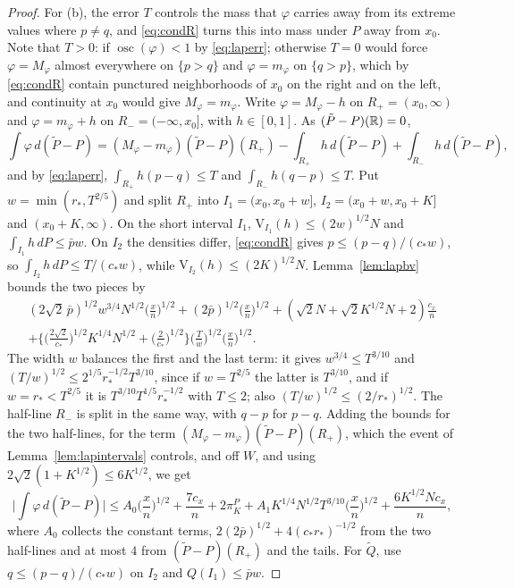 \begin{proof}
For (b), the error $T$ controls the mass that $\varphi$ carries away from its extreme values where $p\neq q$, and
\eqref{eq:condR} turns this into mass under $P$ away from $x_0$. Note that $T>0$: if
$\operatorname{osc}(\varphi)<1$ by \eqref{eq:laperr}; otherwise $T=0$ would force $\varphi=M_\varphi$ almost everywhere on
$\{p>q\}$ and $\varphi=m_\varphi$ on $\{q>p\}$, which by \eqref{eq:condR} contain punctured neighborhoods of $x_0$ on the
right and on the left, and continuity at $x_0$ would give $M_\varphi=m_\varphi$. Write $\varphi=M_\varphi-h$ on $R_+=(x_0,\infty)$ and
$\varphi=m_\varphi+h$ on $R_-=(-\infty,x_0]$, with $h\in[0,1]$. As $(\tilde P-P)(\mathbb{R})=0$,
\[
\int\varphi\,d(\tilde P-P)=(M_\varphi-m_\varphi)(\tilde P-P)(R_+)-\int_{R_+}h\,d(\tilde P-P)+\int_{R_-}h\,d(\tilde P-P),
\]
and by \eqref{eq:laperr}, $\int_{R_+}h(p-q)\le T$ and $\int_{R_-}h(q-p)\le T$. Put $w=\min(r_\ast,T^{2/5})$ and split $R_+$
into $I_1=(x_0,x_0+w]$, $I_2=(x_0+w,x_0+K]$ and $(x_0+K,\infty)$. On the short interval $I_1$,
$\mathrm V_{I_1}(h)\le(2w)^{1/2}N$ and $\int_{I_1}h\,dP\le\bar pw$. On $I_2$ the densities differ, \eqref{eq:condR} gives
$p\le(p-q)/(c_\ast w)$, so $\int_{I_2}h\,dP\le T/(c_\ast w)$, while $\mathrm V_{I_2}(h)\le(2K)^{1/2}N$.
Lemma~\ref{lem:lapbv} bounds the two pieces by
\begin{multline*}
(2\sqrt2\,\bar p)^{1/2}w^{3/4}N^{1/2}\Big(\frac xn\Big)^{1/2}+(2\bar p)^{1/2}\Big(\frac xn\Big)^{1/2}
+(\sqrt2N+\sqrt2K^{1/2}N+2)\frac{c_x}n\\
+\Big\{\Big(\frac{2\sqrt2}{c_\ast}\Big)^{1/2}K^{1/4}N^{1/2}+\Big(\frac2{c_\ast}\Big)^{1/2}\Big\}\Big(\frac Tw\Big)^{1/2}\Big(\frac xn\Big)^{1/2} .
\end{multline*}
The width $w$ balances the first and the last term: it gives $w^{3/4}\le T^{3/10}$ and
$(T/w)^{1/2}\le2^{1/5}r_\ast^{-1/2}T^{3/10}$, since if $w=T^{2/5}$ the latter is $T^{3/10}$, and if $w=r_\ast<T^{2/5}$ it is
$T^{3/10}T^{1/5}r_\ast^{-1/2}$ with $T\le2$; also $(T/w)^{1/2}\le(2/r_\ast)^{1/2}$. The half-line $R_-$ is split in the same
way, with $q-p$ for $p-q$. Adding the bounds for the two half-lines, for the term $(M_\varphi-m_\varphi)(\tilde
P-P)(R_+)$, which the event of Lemma~\ref{lem:lapintervals} controls, and off $W$, and using
$2\sqrt2(1+K^{1/2})\le6K^{1/2}$, we get
\[
\Big|\int\varphi\,d(\tilde P-P)\Big|\le A_0\Big(\frac xn\Big)^{1/2}+\frac{7c_x}n+2\pi^P_K
+A_1K^{1/4}N^{1/2}T^{3/10}\Big(\frac xn\Big)^{1/2}+\frac{6K^{1/2}Nc_x}n ,
\]
where $A_0$ collects the constant terms, $2(2\bar p)^{1/2}+4(c_\ast r_\ast)^{-1/2}$ from the two half-lines and at most
$4$ from $(\tilde P-P)(R_+)$ and the tails. For $\tilde Q$, use $q\le(p-q)/(c_\ast w)$ on $I_2$ and $Q(I_1)\le\bar pw$.
\end{proof}

